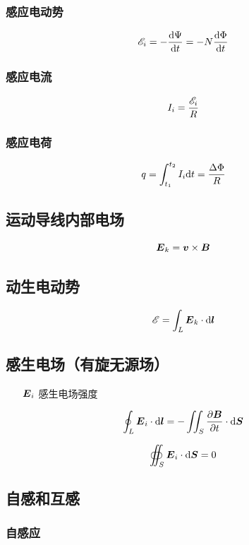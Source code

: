 \documentclass{article}
\begin{document}
\subsubsection{感应电动势}

\[\mathscr E_i=-\frac{\mathrm d\Psi}{\mathrm d t}=-N\frac{\mathrm d\Phi}{\mathrm d t}\]

\subsubsection{感应电流}

\[I_i=\frac{\mathscr E_i}R\]

\subsubsection{感应电荷}

\[q=\int_{t_1}^{t_2}I_i\mathrm d t=\frac{\Delta\Phi}R\]

\subsection{运动导线内部电场}

\[\boldsymbol{E}_k=\boldsymbol{v}\times\boldsymbol{B}\]

\subsection{动生电动势}

\[\mathscr E=\int_L\boldsymbol{E}_k\cdot\mathrm d\boldsymbol{l}\]

\subsection{感生电场（有旋无源场）}

\begin{enumerate}
    \item [$\boldsymbol{E}_i$] 感生电场强度
\end{enumerate}

\[\oint_L\boldsymbol{E}_i\cdot\mathrm d\boldsymbol{l}=-\iint_S\frac{\partial\boldsymbol{B}}{\partial t}\cdot\mathrm d\boldsymbol{S}\]

\[\oiint_S\boldsymbol{E}_i\cdot\mathrm d\boldsymbol{S}=0\]

\subsection{自感和互感}

\subsubsection{自感应}
\end{document}
